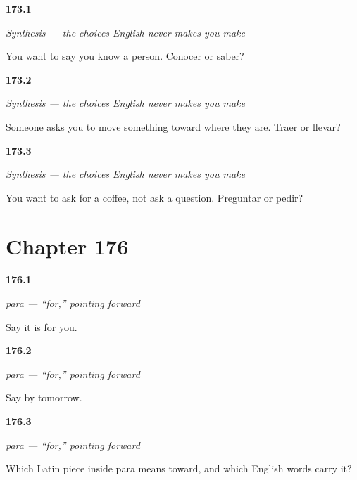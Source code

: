 \noindent\begin{minipage}[t]{\linewidth}
\raggedright
\hypertarget{review-ES-C39-sintesis-elegir-know}{\textbf{173.1}} \emph{Synthesis — the choices English never makes you make}\par
\small You want to say you know a person. Conocer or saber?
\end{minipage}\par\medskip

\noindent\begin{minipage}[t]{\linewidth}
\raggedright
\hypertarget{review-ES-C39-sintesis-elegir-bring}{\textbf{173.2}} \emph{Synthesis — the choices English never makes you make}\par
\small Someone asks you to move something toward where they are. Traer or llevar?
\end{minipage}\par\medskip

\noindent\begin{minipage}[t]{\linewidth}
\raggedright
\hypertarget{review-ES-C39-sintesis-elegir-ask}{\textbf{173.3}} \emph{Synthesis — the choices English never makes you make}\par
\small You want to ask for a coffee, not ask a question. Preguntar or pedir?
\end{minipage}\par\medskip

\section*{Chapter 176}

\noindent\begin{minipage}[t]{\linewidth}
\raggedright
\hypertarget{review-ES-C51-para-you}{\textbf{176.1}} \emph{para — \textquotedblleft{}for,\textquotedblright{} pointing forward}\par
\small Say it is for you.
\end{minipage}\par\medskip

\noindent\begin{minipage}[t]{\linewidth}
\raggedright
\hypertarget{review-ES-C51-para-when}{\textbf{176.2}} \emph{para — \textquotedblleft{}for,\textquotedblright{} pointing forward}\par
\small Say by tomorrow.
\end{minipage}\par\medskip

\noindent\begin{minipage}[t]{\linewidth}
\raggedright
\hypertarget{review-ES-C51-para-arrow}{\textbf{176.3}} \emph{para — \textquotedblleft{}for,\textquotedblright{} pointing forward}\par
\small Which Latin piece inside para means toward, and which English words carry it?
\end{minipage}\par\medskip


